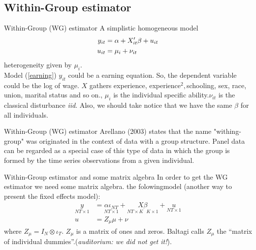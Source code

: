 \subsection{Within-Group estimator}
\begin{frame}{Within-Group (WG) estimator}
	A simplistic homogeneous model%
		\begin{align}
			y_{it} & =\alpha +X_{it}^{\prime }\beta +u_{it}  \label{earning} \\
			u_{it} & =\mu_{i}+\nu_{it}  \notag
		\end{align}
	heterogeneity given by $\mu _{i}.$\\
	
	Model (\ref{earning}) $y_{it}$ could be a earning equation. So, the dependent variable could be the log of wage. $X$ gathers experience, experience$^{2},$schooling, sex, race, union, marital status and so on., $\mu_{i}$ is the individual specific ability.$\nu_{it}$ is the classical disturbance \emph{iid}. Also, we should take notice that we have the same $\beta$ for all individuals.
\end{frame}
\begin{frame}{Within-Group (WG) estimator}	
	Arellano (2003) states that the name "withing-group" was originated in the context of data with a group structure. Panel data can be regarded as a special case of this type of data in which the group is formed by the time series observations from a given individual.
\end{frame}
\begin{frame}{Within-Group estimator and some matrix algebra}
	In order to get the WG estimator we need some matrix algebra. the folowingmodel (another way to present the fixed effects model):
		\begin{align*}
			\underset{NT\times 1}{y} & = \underset{NT\times 1}{\alpha \iota _{NT}}+\underset{NT\times K\text{ }K\times 1}{X\beta }+\underset{NT\times 1}{u} \\
			u & = Z_{\mu }\mu +\nu
		\end{align*}
	where $Z_{\mu}=I_{N}\otimes \iota _{T}.$ $Z_{\mu }$ is a matrix of ones and zeros. Baltagi calls $Z_{\mu}$ the ``matrix of individual dummies''.(\emph{auditorium: we did not get it!}).
\end{frame}
